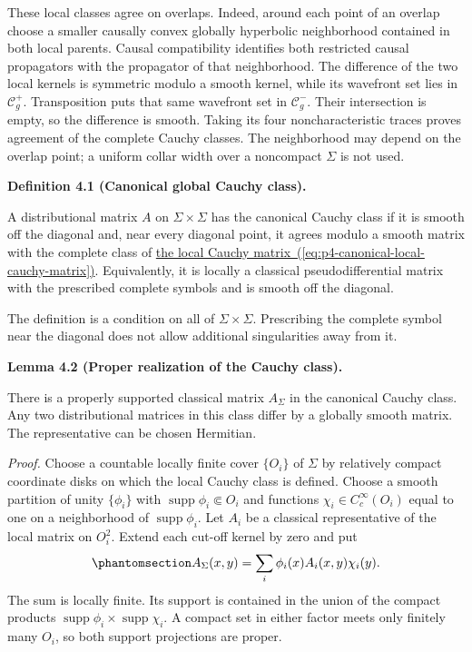 \documentclass[
  english,
  11pt,
  reqno]{amsart}
\makeatletter
\newcommand{\pandocstatementheading}[1]{%
  \par\addpenalty{\@beginparpenalty}%
  \addvspace{.5\baselineskip plus .2\baselineskip minus .2\baselineskip}%
  {\normalfont\bfseries #1\par}%
  \nobreak\@afterindenttrue\@afterheading
}
\makeatother
\begin{document}
These local classes agree on overlaps. Indeed, around each point of an
overlap choose a smaller causally convex globally hyperbolic
neighborhood contained in both local parents. Causal compatibility
identifies both restricted causal propagators with the propagator of
that neighborhood. The difference of the two local kernels is symmetric
modulo a smooth kernel, while its wavefront set lies in
\(\mathcal C_g^+\). Transposition puts that same wavefront set in
\(\mathcal C_g^-\). Their intersection is empty, so the difference is
smooth. Taking its four noncharacteristic traces proves agreement of the
complete Cauchy classes. The neighborhood may depend on the overlap
point; a uniform collar width over a noncompact \(\Sigma\) is not used.

\pandocstatementheading{\protect{}\label{def:p4-canonical-cauchy-class}Definition 4.1 (Canonical global Cauchy class).}

A distributional matrix \(A\) on \(\Sigma\times\Sigma\) has the
canonical Cauchy class if it is smooth off the diagonal and, near every
diagonal point, it agrees modulo a smooth matrix with the complete class
of \hyperref[eq:p4-canonical-local-cauchy-matrix]{the local Cauchy
matrix~(\ref*{eq:p4-canonical-local-cauchy-matrix})}. Equivalently, it is locally a classical pseudodifferential
matrix with the prescribed complete symbols and is smooth off the
diagonal.

The definition is a condition on all of \(\Sigma\times\Sigma\).
Prescribing the complete symbol near the diagonal does not allow
additional singularities away from it.

\pandocstatementheading{\protect{}\label{lem:p4-proper-cauchy-representative}Lemma 4.2 (Proper realization of the Cauchy class).}

There is a properly supported classical matrix \(A_\Sigma\) in the
canonical Cauchy class. Any two distributional matrices in this class
differ by a globally smooth matrix. The representative can be chosen
Hermitian.

\emph{Proof.} Choose a countable locally finite cover \(\{O_i\}\) of
\(\Sigma\) by relatively compact coordinate disks on which the local
Cauchy class is defined. Choose a smooth partition of unity
\(\{\phi_i\}\) with \(\operatorname{supp}\phi_i\Subset O_i\) and
functions \(\chi_i\in C_c^\infty(O_i)\) equal to one on a neighborhood
of \(\operatorname{supp}\phi_i\). Let \(A_i\) be a classical
representative of the local matrix on \(O_i^2\). Extend each cut-off
kernel by zero and put
\begin{equation}\protect\phantomsection\label{eq:p4-proper-cauchy-gluing}{
A_\Sigma(x,y)=\sum_i\phi_i(x)A_i(x,y)\chi_i(y).
}\end{equation} The sum is locally finite. Its support is contained in
the union of the compact products
\(\operatorname{supp}\phi_i\times\operatorname{supp}\chi_i\). A compact
set in either factor meets only finitely many \(O_i\), so both support
projections are proper.
\end{document}
